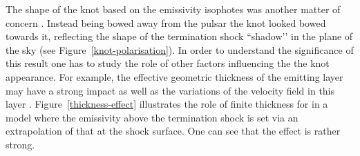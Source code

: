 The shape of the knot based on the emissivity isophotes was another matter of concern \citep{YB-15}. Instead being bowed away from the pulsar the knot looked bowed towards it, reflecting the shape of the termination shock ``shadow’’ in the plane of the sky (see Figure~\ref{knot-polarisation}). In order to understand the significance of this result one has to study the role of other factors influencing the the knot appearance. For example,  the effective geometric thickness of the emitting layer may have a strong impact as well as the variations of the velocity field in this layer \citep{LKP-16,YB-15}.  Figure~\ref{thickness-effect} illustrates the role of finite thickness for in a model where the emissivity above the termination shock is set via an extrapolation of that at the shock surface\citep{LKP-16}. One can see that the effect is rather strong.    

